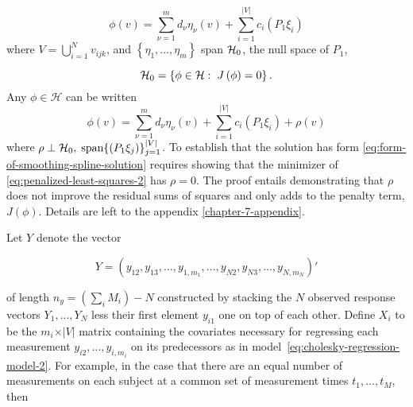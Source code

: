 \begin{equation} \label{eq:form-of-smoothing-spline-solution}
\phi\left( v \right) = \sum_{\nu=1}^{m} d_\nu \eta_\nu \left( v \right) + \sum_{i = 1}^{\vert V \vert} c_{i}\left(P_1 \xi_i \right)
\end{equation}
\noindent
where $V = \bigcup\limits_{i = 1}^N v_{ijk}$, and $\left\{\eta_1,\dots, \eta_{m}\right\}$ span $\mathcal{H}_0$, the null space of $P_1$,

\begin{equation*}
\mathcal{H}_0 = \left\{ \phi \in \mathcal{H}:\;J\left( \phi \right) = 0 \right\}.
\end{equation*}
\noindent
Any $\phi \in \mathcal{H}$ can be written 
\begin{equation} \label{eq:smoothing-spline-representer-expansion-1}
\phi\left( v \right) = \sum_{\nu=1}^{m} d_\nu \eta_\nu \left( v \right) + \sum_{i = 1}^{\vert V \vert} c_{i}\left(P_1 \xi_i \right) + \rho\left(v\right)
\end{equation}
\noindent
where $\rho \perp \mathcal{H}_0,\; \textup{span}\lbrace \left(P_1 \xi_{j} \right) \rbrace_{j = 1}^{\vert V\vert}$. To establish that the solution has form \ref{eq:form-of-smoothing-spline-solution} requires showing that the minimizer of \ref{eq:penalized-least-squares-2} has $\rho = 0$. The proof entails demonstrating that $\rho$ does not improve the residual sums of squares and only adds to the penalty term, $J\left(\phi\right)$. Details are left to the appendix \ref{chapter-7-appendix}.

Let $Y$ denote the vector 

\[
Y = \left( y_{12}, y_{13},\dots, y_{1,m_1}, \dots, y_{N2}, y_{N3},\dots, y_{N,m_N} \right)'
\]

of length $n_y=\left(\sum \limits_{i} M_i \right) - N$  constructed by stacking the $N$ observed response vectors $Y_1,\dots, Y_N$ less their first element $y_{i1}$ one on top of each other. Define $X_i$ to be the $m_i \times \vert V \vert$ matrix containing the covariates necessary for regressing each measurement $y_{i2}, \dots, y_{i,m_i}$ on its predecessors as in model~\ref{eq:cholesky-regression-model-2}. For example, in the case that there are an equal number of measurements on each subject at a common set of measurement times $t_1,\dots, t_M$, then 

